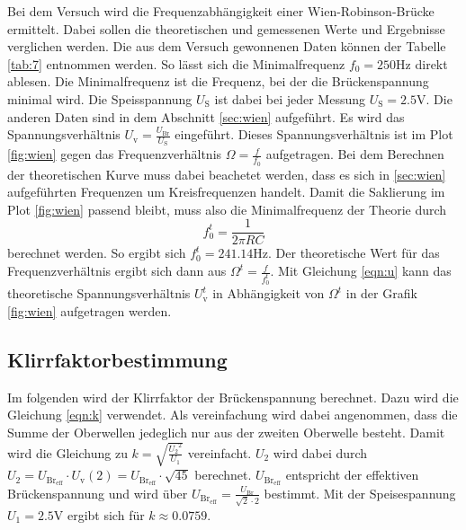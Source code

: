 Bei dem Versuch wird die Frequenzabhängigkeit einer Wien-Robinson-Brücke ermittelt. Dabei sollen die theoretischen und gemessenen Werte und Ergebnisse verglichen werden.
Die aus dem Versuch gewonnenen Daten können der Tabelle \ref{tab:7} entnommen werden. So lässt sich die Minimalfrequenz
$f_0=250\si{\hertz}$ direkt ablesen. Die Minimalfrequenz ist die Frequenz, bei der die Brückenspannung minimal wird. Die Speisspannung 
$U_{\text{S}}$ ist dabei bei jeder Messung $U_{\text{S}}=2.5 \si{\volt}$. Die anderen Daten sind in dem Abschnitt \ref{sec:wien} aufgeführt.
Es wird das Spannungsverhältnis $U_{\text{v}}=\frac{U_{\text{Br}}}{U_{\text{S}}}$ eingeführt. Dieses Spannungsverhältnis ist im Plot \ref{fig:wien}
gegen das Frequenzverhältnis $\Omega=\frac{f}{f_0}$ aufgetragen. Bei dem Berechnen der theoretischen Kurve muss dabei beachetet werden,
dass es sich in \ref{sec:wien} aufgeführten Frequenzen um Kreisfrequenzen handelt. Damit die Saklierung im Plot \ref{fig:wien} passend bleibt,
muss also die Minimalfrequenz der Theorie durch 
\begin{equation}
    f_{0}^{t}=\frac{1}{2\pi RC}
\end{equation} 
berechnet werden. So ergibt sich $f_{0}^{t}=241.14\si{\hertz}$. Der theoretische Wert für das Frequenzverhältnis ergibt sich dann aus $\Omega^{t}=\frac{f}{f_{0}^{t}}$.
Mit Gleichung \eqref{eqn:u} kann das theoretische Spannungsverhältnis $U_{\text{v}}^{t}$ in Abhängigkeit von $\Omega^{t}$ in der Grafik
\ref{fig:wien} aufgetragen werden.

\subsection{Klirrfaktorbestimmung} %
\label{sub:Klirrfaktorbestimmung}

Im folgenden wird der Klirrfaktor der Brückenspannung berechnet. Dazu wird die Gleichung \eqref{eqn:k} verwendet. 
Als vereinfachung wird dabei angenommen, dass die Summe der Oberwellen jedeglich nur aus der zweiten Oberwelle besteht.
Damit wird die Gleichung zu $k = \sqrt{\frac{ {U_2}^2}{U_1}}$ vereinfacht. $U_2$ wird dabei durch $U_2=U_{\text{Br}_\text{eff}}\cdot U_{\text{v}}(2)=U_{\text{Br}_\text{eff}}\cdot \sqrt{45}$ berechnet.
$U_{\text{Br}_\text{eff}}$ entspricht der effektiven Brückenspannung und wird über $U_{\text{Br}_\text{eff}}=\frac{U_{\text{Br}}}{\sqrt{2}\cdot2}$ bestimmt.
Mit der Speisespannung $U_1=2.5\si{\volt}$ ergibt sich für $k\approx 0.0759$.
 




%
